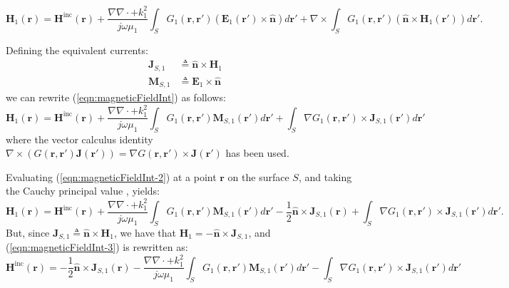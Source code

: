 \documentclass[a4paper,10pt]{book}
\newcommand{\field}[1]{\mathbf{#1}}
\newcommand{\current}[1]{\mathbf{#1}}
\newcommand{\vect}[1]{\mathbf{#1}}
\begin{document}
\begin{equation}\label{eqn:magneticFieldInt}
\field{H}_1\left(\vect{r}\right) = \field{H}^\text{inc}\left(\vect{r}\right) + \frac{\nabla \nabla \cdot + k_1^2}{j \omega \mu_1} \int_S G_1(\vect{r}, \vect{r}') \left(\field{E}_1\left(\vect{r}'\right) \times \vect{\hat{n}}\right) d\vect{r}' + \nabla \times \int_S G_1(\vect{r}, \vect{r}') \left(  \vect{\hat{n}} \times \field{H}_1\left(\vect{r}'\right) \right) d\vect{r}'.
\end{equation}
%
\par
Defining the equivalent currents:
\begin{align}
\current{J}_{S,1} &\triangleq \vect{\hat{n}} \times \field{H}_1 \\
\current{M}_{S,1} &\triangleq \field{E}_1 \times \vect{\hat{n}} 
\end{align}
we can rewrite (\ref{eqn:magneticFieldInt}) as follows:
\begin{equation}\label{eqn:magneticFieldInt-2}
\field{H}_1\left(\vect{r}\right) = \field{H}^\text{inc}\left(\vect{r}\right) + \frac{\nabla \nabla \cdot + k_1^2}{j \omega \mu_1} \int_S G_1(\vect{r}, \vect{r}') \current{M}_{S,1}\left(\vect{r}'\right) d\vect{r}' + \int_S \nabla G_1(\vect{r}, \vect{r}') \times \current{J}_{S,1}\left(\vect{r}'\right) d\vect{r}' 
\end{equation}
where the vector calculus identity $\nabla \times \left( G(\vect{r}, \vect{r}') \current{J}\left(\vect{r}'\right)\right) = \nabla G(\vect{r}, \vect{r}') \times \current{J}\left(\vect{r}'\right)$ has been used.
%
\par
Evaluating (\ref{eqn:magneticFieldInt-2}) at a point $\vect{r}$ on the surface $S$, and taking the Cauchy principal value \cite{Arnoldus2011}, \cite[p.~139]{Morita_90} yields:
\begin{equation}\label{eqn:magneticFieldInt-3}
\field{H}_1\left(\vect{r}\right) = \field{H}^\text{inc}\left(\vect{r}\right) + \frac{\nabla \nabla \cdot + k_1^2}{j \omega \mu_1} \int_S G_1(\vect{r}, \vect{r}') \current{M}_{S,1}\left(\vect{r}'\right) d\vect{r}' -\frac{1}{2} \vect{\hat{n}} \times \current{J}_{S,1}\left(\vect{r}\right) + \int_S \nabla G_1(\vect{r}, \vect{r}') \times \current{J}_{S,1}\left(\vect{r}'\right) d\vect{r}'.
\end{equation}
But, since $\current{J}_{S,1} \triangleq \vect{\hat{n}} \times \field{H}_1$, we have that $\field{H}_1 = -\vect{\hat{n}} \times \current{J}_{S,1}$, and (\ref{eqn:magneticFieldInt-3}) is rewritten as:
\begin{equation}\label{eqn:magneticFieldInt-4}
\boxed{
\field{H}^\text{inc}\left(\vect{r}\right) = - \frac{1}{2} \vect{\hat{n}} \times \current{J}_{S,1}\left(\vect{r}\right) - \frac{\nabla \nabla \cdot + k_1^2}{j \omega \mu_1} \int_S G_1(\vect{r}, \vect{r}') \current{M}_{S,1}\left(\vect{r}'\right) d\vect{r}'  - \int_S \nabla G_1(\vect{r}, \vect{r}') \times \current{J}_{S,1}\left(\vect{r}'\right) d\vect{r}'}
\end{equation}
\end{document}
